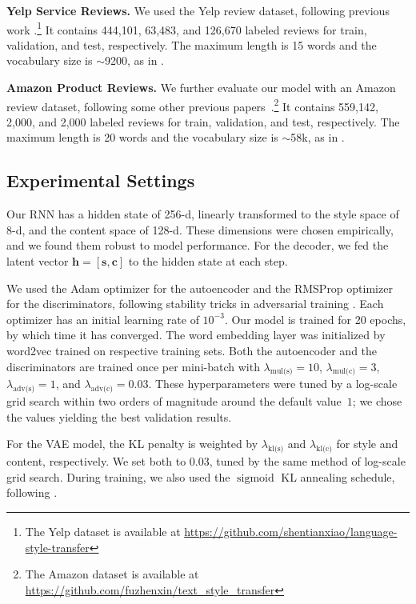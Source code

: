 \documentclass[11pt,a4paper]{article}
\newcommand{\hyp}[1]{\lambda_{\text{#1}}}
\begin{document}
\textbf{Yelp Service Reviews.}
We used the Yelp review dataset, following previous work \cite{shen2017style,zhao2018adversarially}.\footnote{The Yelp dataset is available at \url{https://github.com/shentianxiao/language-style-transfer}}
It contains 444,101, 63,483, and 126,670 labeled reviews for train, validation, and test, respectively.
The maximum length is 15 words and the vocabulary size is $\sim$9200, as in \citet{shen2017style}.

\textbf{Amazon Product Reviews.}
We further evaluate our model with an Amazon review dataset, following some other previous papers~\cite{fu2018style}.\footnote{The Amazon dataset is available at \url{https://github.com/fuzhenxin/text_style_transfer}}
It contains 559,142, 2,000, and 2,000 labeled reviews for train, validation, and test, respectively.
The maximum length is 20 words and the vocabulary size is $\sim$58k, as in \citet{fu2018style}.


\subsection{Experimental Settings}

Our RNN has a hidden state of 256-d, linearly transformed to the style space of 8-d, and the content space of 128-d. These dimensions were chosen empirically, and we found them robust to model performance.
For the decoder, we fed the latent vector $\bm h=[\bm s, \bm c]$ to the hidden state at each step.

We used the Adam optimizer \cite{kingma2014adam} for the autoencoder and the RMSProp optimizer \cite{tieleman2012lecture} for the discriminators, following stability tricks in adversarial training  \cite{arjovsky2017wasserstein}.
Each optimizer has an initial learning rate of $10^{-3}$.
Our model is trained for 20 epochs, by which time it has converged.
The word embedding layer was initialized by word2vec \cite{mikolov2013distributed} trained on respective training sets.
Both the autoencoder and the discriminators are trained once per mini-batch with $\hyp{mul(s)}\!\!=\!\!10$, $\hyp{mul(c)}\!\!=\!\!3$, $\hyp{adv(s)}\!\!=\!\!1$, and $\hyp{adv(c)} = 0.03$.
These hyperparameters were tuned by a log-scale grid search within two orders of magnitude around the default value~$1$; we chose the values yielding the best validation results.

For the VAE model, the KL penalty is weighted by $\hyp{kl(s)}$ and $\hyp{kl(c)}$ for style and content, respectively.
We set both to $0.03$, tuned by the same method of log-scale grid search. During training, we also used the $\operatorname{sigmoid}$ KL annealing schedule, following \citet{bahuleyan2017variational}.
\end{document}
